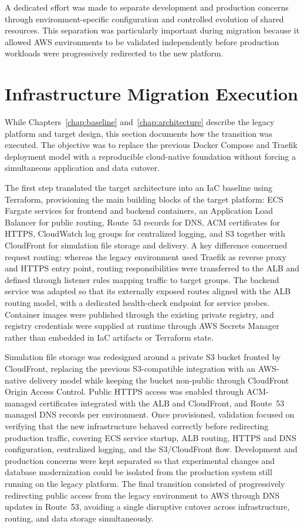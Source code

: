 A dedicated effort was made to separate development and production concerns through environment-specific configuration and controlled evolution of shared resources. This separation was particularly important during migration because it allowed AWS environments to be validated independently before production workloads were progressively redirected to the new platform.

\section{Infrastructure Migration Execution}
\label{sec:infra-migration-exec}
While Chapters~\ref{chap:baseline} and~\ref{chap:architecture} describe the legacy platform and target design, this section documents how the transition was executed. The objective was to replace the previous Docker Compose and Traefik deployment model with a reproducible cloud-native foundation without forcing a simultaneous application and data cutover.

The first step translated the target architecture into an IaC baseline using Terraform, provisioning the main building blocks of the target platform: ECS Fargate services for frontend and backend containers, an Application Load Balancer for public routing, Route~53 records for DNS, ACM certificates for HTTPS, CloudWatch log groups for centralized logging, and S3 together with CloudFront for simulation file storage and delivery. A key difference concerned request routing: whereas the legacy environment used Traefik as reverse proxy and HTTPS entry point, routing responsibilities were transferred to the ALB and defined through listener rules mapping traffic to target groups. The backend service was adapted so that its externally exposed routes aligned with the ALB routing model, with a dedicated health-check endpoint for service probes. Container images were published through the existing private registry, and registry credentials were supplied at runtime through AWS Secrets Manager rather than embedded in IaC artifacts or Terraform state.

Simulation file storage was redesigned around a private S3 bucket fronted by CloudFront, replacing the previous S3-compatible integration with an AWS-native delivery model while keeping the bucket non-public through CloudFront Origin Access Control. Public HTTPS access was enabled through ACM-managed certificates integrated with the ALB and CloudFront, and Route~53 managed DNS records per environment. Once provisioned, validation focused on verifying that the new infrastructure behaved correctly before redirecting production traffic, covering ECS service startup, ALB routing, HTTPS and DNS configuration, centralized logging, and the S3/CloudFront flow. Development and production concerns were kept separated so that experimental changes and database modernization could be isolated from the production system still running on the legacy platform. The final transition consisted of progressively redirecting public access from the legacy environment to AWS through DNS updates in Route~53, avoiding a single disruptive cutover across infrastructure, routing, and data storage simultaneously.

